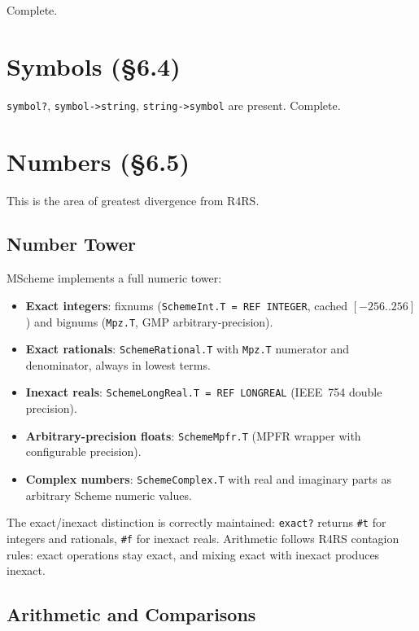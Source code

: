 \documentclass[12pt]{report}
\begin{document}
\noindent Complete.

\section{Symbols (\S6.4)}

{\tt symbol?}, {\tt symbol->string}, {\tt string->symbol} are present.
Complete.

\section{Numbers (\S6.5)}
\label{sec:numbers}

This is the area of greatest divergence from R4RS.

\subsection{Number Tower}

MScheme implements a full numeric tower:
\begin{itemize}
\item \textbf{Exact integers}: fixnums ({\tt SchemeInt.T = REF INTEGER},
  cached $[-256..256]$) and bignums ({\tt Mpz.T}, GMP
  arbitrary-precision).
\item \textbf{Exact rationals}: {\tt SchemeRational.T} with {\tt Mpz.T}
  numerator and denominator, always in lowest terms.
\item \textbf{Inexact reals}: {\tt SchemeLongReal.T = REF LONGREAL}
  (IEEE~754 double precision).
\item \textbf{Arbitrary-precision floats}: {\tt SchemeMpfr.T} (MPFR
  wrapper with configurable precision).
\item \textbf{Complex numbers}: {\tt SchemeComplex.T} with real and
  imaginary parts as arbitrary Scheme numeric values.
\end{itemize}

\noindent The exact/inexact distinction is correctly maintained:
{\tt exact?} returns {\tt \#t} for integers and rationals, {\tt \#f}
for inexact reals.  Arithmetic follows R4RS contagion rules: exact
operations stay exact, and mixing exact with inexact produces inexact.

\subsection{Arithmetic and Comparisons}
\end{document}
